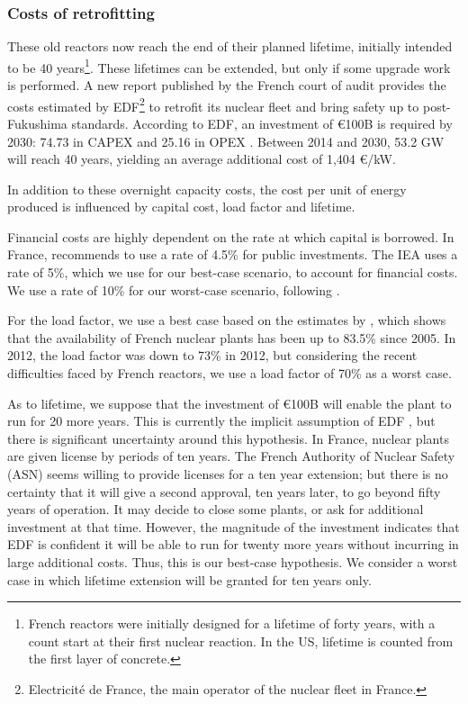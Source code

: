 \subsubsection{Costs of retrofitting}
These old reactors now reach the end of their planned lifetime, initially intended to be 40 years\footnote{
	French reactors were initially designed for a lifetime of forty years, with a count start at their first nuclear reaction. In the US, lifetime is counted from the first layer of concrete.
}.
These lifetimes can be extended, but only if some upgrade work is performed. A new report published by the French court of audit \citep{CourdesComptes2016} provides the costs estimated by EDF\footnote{Electricité de France, the main operator of the nuclear fleet in France.} to retrofit its nuclear fleet and bring safety up to post-Fukushima standards. According to EDF, an investment of \euro 100B is required by 2030: 74.73 in CAPEX and 25.16 in OPEX \citep{CourdesComptes2016}.
Between 2014 and 2030, 53.2 GW will reach 40 years, yielding an average additional cost of 1,404 \euro/kW.

In addition to these overnight capacity costs, the cost per unit of energy produced is influenced by capital cost, load factor and lifetime.

Financial costs are highly dependent on the rate at which capital is borrowed. 
In France, \citet{Quinet2013} recommends to use a rate of 4.5\% for public investments.
The IEA uses a rate of 5\%, which we use for our best-case scenario, to account for financial costs.
We use a rate of 10\% for our worst-case scenario, following \citet{Boccard2014}.

For the load factor, we use a best case based on the estimates by \citet[p. 116]{CourdesComptes2016}, which shows that the availability of French nuclear plants has been up to 83.5\% since 2005. In 2012, the load factor was down to 73\% in 2012, but considering the recent difficulties faced by French reactors, we use a load factor of 70\% as a worst case.

As to lifetime, we suppose that the investment of \euro 100B will enable the plant to run for 20 more years. This is currently the implicit assumption of EDF \citep[p. 13]{AN2017}, but there is significant uncertainty around this hypothesis. In France, nuclear plants are given license by periods of ten years. 
The French Authority of Nuclear Safety (ASN) seems willing to provide licenses for a ten year extension; but there is no certainty that it will give a second approval, ten years later, to go beyond fifty years of operation. 
It may decide to close some plants, or ask for additional investment at that time. However, the magnitude of the investment indicates that EDF is confident it will be able to run for twenty more years without incurring in large additional costs. Thus, this is our best-case hypothesis. We consider a worst case in which lifetime extension will be granted for ten years only. 


